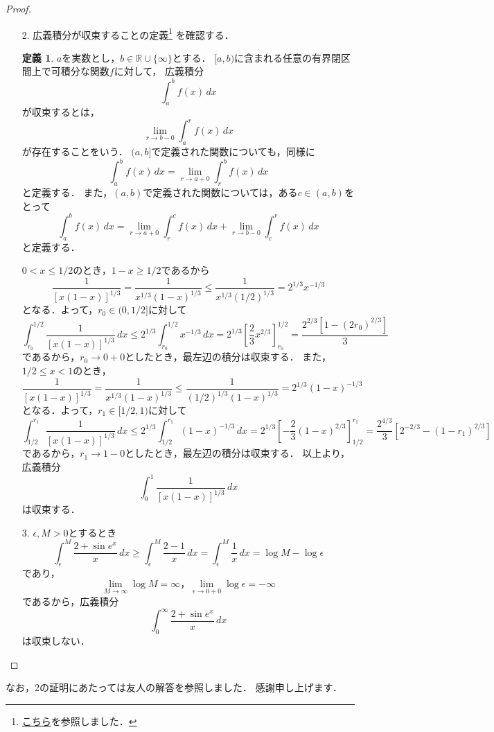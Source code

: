 \documentclass{jsarticle}
\theoremstyle{definition}
\newtheorem{defi}{定義}[section]
\begin{document}
\begin{proof}
\begin{itemize}
\item[2.]広義積分が収束することの定義\footnote{\href{https://lecture.ecc.u-tokyo.ac.jp/~nkiyono/kiyono/12_kata-07.pdf}{こちら}を参照しました．}
を確認する．
\begin{boxnote}\begin{defi}
$a$を実数とし，$b\in\mathbb{R}\cup\{\infty\}$とする．
$[a,b)$に含まれる任意の有界閉区間上で可積分な関数$f$に対して，
広義積分
\[ \int_a^bf(x)\,dx \]
が収束するとは，
\[ \lim_{r\to b-0}\int_a^rf(x)\,dx \]
が存在することをいう．
$(a,b]$で定義された関数についても，同様に
\[ \int_a^bf(x)\,dx=\lim_{r\to a+0}\int_r^bf(x)\,dx \]
と定義する．
また，$(a,b)$で定義された関数については，ある$c\in(a,b)$をとって
\[ \int_a^bf(x)\,dx=\lim_{r\to a+0}\int_r^cf(x)\,dx+\lim_{r\to b-0}\int_c^rf(x)\,dx \]
と定義する．
\end{defi}\end{boxnote}
$0<x\leq1/2$のとき，$1-x\geq1/2$であるから
\[ \frac{1}{[x(1-x)]^{1/3}}=\frac{1}{x^{1/3}(1-x)^{1/3}}
\leq\frac{1}{x^{1/3}(1/2)^{1/3}}=2^{1/3}x^{-1/3} \]
となる．よって，$r_0\in(0,1/2]$に対して
\[ \int_{r_0}^{1/2}\frac{1}{[x(1-x)]^{1/3}}\,dx
\leq2^{1/3}\int_{r_0}^{1/2}x^{-1/3}\,dx
=2^{1/3}\left[\frac{2}{3}x^{2/3}\right]_{r_0}^{1/2}
=\frac{2^{2/3}[1-(2r_0)^{2/3}]}{3} \]
であるから，$r_0\to0+0$としたとき，最左辺の積分は収束する．
また，$1/2\leq x<1$のとき，
\[ \frac{1}{[x(1-x)]^{1/3}}=\frac{1}{x^{1/3}(1-x)^{1/3}}
\leq\frac{1}{(1/2)^{1/3}(1-x)^{1/3}}=2^{1/3}(1-x)^{-1/3} \]
となる．よって，$r_1\in[1/2,1)$に対して
\[ \int_{1/2}^{r_1}\frac{1}{[x(1-x)]^{1/3}}\,dx
\leq2^{1/3}\int_{1/2}^{r_1}(1-x)^{-1/3}\,dx
=2^{1/3}\left[-\frac{2}{3}(1-x)^{2/3}\right]_{1/2}^{r_1}
=\frac{2^{4/3}}{3}[2^{-2/3}-(1-r_1)^{2/3}] \]
であるから，$r_1\to1-0$としたとき，最左辺の積分は収束する．
以上より，広義積分
\[ \int_0^1\frac{1}{[x(1-x)]^{1/3}}\,dx \]
は収束する．

\item[3.]$\epsilon,M>0$とするとき
\[ \int_\epsilon^M\frac{2+\sin{e^x}}{x}\,dx
\geq\int_\epsilon^M\frac{2-1}{x}\,dx
=\int_\epsilon^M\frac{1}{x}\,dx
=\log{M}-\log{\epsilon} \]
であり，
\[ \lim_{M\to\infty}\log{M}=\infty，\lim_{\epsilon\to0+0}\log{\epsilon}=-\infty \]
であるから，広義積分
\[ \int_0^\infty\frac{2+\sin{e^x}}{x}\,dx \]
は収束しない．
\end{itemize}
\end{proof}

なお，2の証明にあたっては友人の解答を参照しました．
感謝申し上げます．
\end{document}

